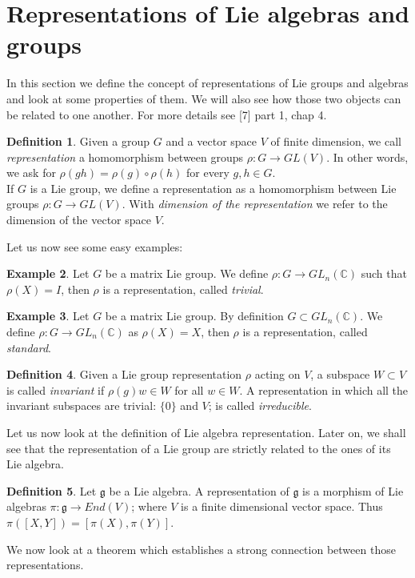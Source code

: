 \documentclass[12pt,a4paper]{report}
\theoremstyle{definition}
\newtheorem{Def}{Definition}[chapter]
\theoremstyle{Theorem}
\theoremstyle{definition}
\newtheorem{Ex}[Def]{Example}
\theoremstyle{definition}
\begin{document}
	\section{Representations of Lie algebras and groups}
	In this section we define the concept of representations of Lie groups and algebras and look at some properties of them. We will also see how those two objects can be related to one another. For more details see [7] part 1, chap 4.
	\begin{Def}
		Given a group $G$ and a vector space $V$ of finite dimension, we call \textit{representation} a homomorphism between groups $\rho:G\rightarrow GL(V)$. In other words, we ask for $\rho(gh)=\rho(g)\circ\rho(h)$ for every $g,h\in G$.\\
		If $G$ is a Lie group, we define a representation as a homomorphism between Lie groups $\rho:G\rightarrow GL(V)$. With \textit{dimension of the representation} we refer to the dimension of the vector space $V$.
	\end{Def}Let us now see some easy examples:
	\begin{Ex}
		Let $G$ be a matrix Lie group. We define $\rho: G\rightarrow GL_n(\mathbb{C})$ such that $\rho(X)=I$, then $\rho$ is a representation, called \textit{trivial}. 
	\end{Ex}
	\begin{Ex}
		Let $G$ be a matrix Lie group. By definition $G\subset GL_n(\mathbb{C})$. We define $\rho: G\rightarrow GL_n(\mathbb{C})$ as $\rho(X)=X$, then $\rho$ is a representation, called \textit{standard}. 
	\end{Ex}
	\begin{Def}
		Given a Lie group representation $\rho$ acting on $V$, a subspace $W\subset V$ is called \textit{invariant} if $\rho(g)w\in W$ for all $w\in W$.
		A representation in which all the invariant subspaces are trivial: $\{0\}$ and $V$; is called \textit{irreducible}.
	\end{Def}
	Let us now look at the definition of Lie algebra representation. Later on, we shall see that the representation of a Lie group are strictly related to the ones of its Lie algebra.
	\begin{Def}
		Let $\mathfrak{g}$ be a Lie algebra. A representation of $\mathfrak{g}$ is a morphism of Lie algebras $\pi:\mathfrak{g}\rightarrow End(V)$; where $V$ is a finite dimensional vector space. Thus $\pi([X,Y])=[\pi(X),\pi(Y)]$.
	\end{Def}
	We now look at a theorem which establishes a strong connection between those representations.
\end{document}
